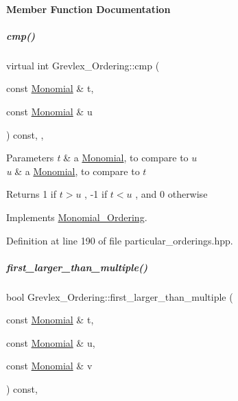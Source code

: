 \paragraph{Member Function Documentation}
\mbox{\label{group__orderinggroup_a1b668700d9ccc218ebae6049bb76fb07}} 
\subparagraph{\texorpdfstring{cmp()}{cmp()}}
{\footnotesize\ttfamily virtual int Grevlex\+\_\+\+Ordering\+::cmp (\begin{DoxyParamCaption}\item[{const \hyperlink{group__polygroup_class_monomial}{Monomial} \&}]{t,  }\item[{const \hyperlink{group__polygroup_class_monomial}{Monomial} \&}]{u }\end{DoxyParamCaption}) const\hspace{0.3cm}{\ttfamily [inline]}, {\ttfamily [override]}, {\ttfamily [virtual]}}


\begin{DoxyParams}{Parameters}
{\em t} & a \hyperlink{group__polygroup_class_monomial}{Monomial}, to compare to $ u $ \\
\hline
{\em u} & a \hyperlink{group__polygroup_class_monomial}{Monomial}, to compare to $ t $ \\
\hline
\end{DoxyParams}
\begin{DoxyReturn}{Returns}
1 if $ t > u $ , -\/1 if $ t < u $ , and 0 otherwise 
\end{DoxyReturn}


Implements \hyperlink{group__orderinggroup_a9bc3155fc98b4d40c26118fa2114b827}{Monomial\+\_\+\+Ordering}.



Definition at line 190 of file particular\+\_\+orderings.\+hpp.

\mbox{\label{group__orderinggroup_a4f8a9207711dabeb940fba0e32f4ab1f}} 
\subparagraph{\texorpdfstring{first\+\_\+larger\+\_\+than\+\_\+multiple()}{first\_larger\_than\_multiple()}}
{\footnotesize\ttfamily bool Grevlex\+\_\+\+Ordering\+::first\+\_\+larger\+\_\+than\+\_\+multiple (\begin{DoxyParamCaption}\item[{const \hyperlink{group__polygroup_class_monomial}{Monomial} \&}]{t,  }\item[{const \hyperlink{group__polygroup_class_monomial}{Monomial} \&}]{u,  }\item[{const \hyperlink{group__polygroup_class_monomial}{Monomial} \&}]{v }\end{DoxyParamCaption}) const\hspace{0.3cm}{\ttfamily [override]}, {\ttfamily [virtual]}}


